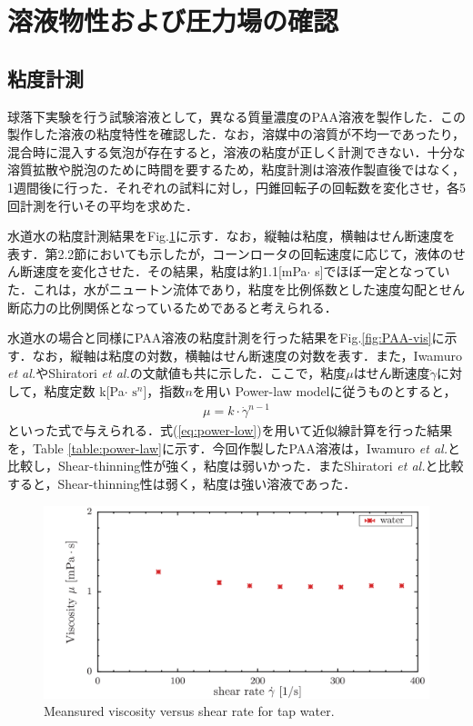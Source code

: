 \section{溶液物性および圧力場の確認}
\subsection{粘度計測}
球落下実験を行う試験溶液として，異なる質量濃度のPAA溶液を製作した．この製作した溶液の粘度特性を確認した．なお，溶媒中の溶質が不均一であったり，混合時に混入する気泡が存在すると，溶液の粘度が正しく計測できない．十分な溶質拡散や脱泡のために時間を要するため，粘度計測は溶液作製直後ではなく，1週間後に行った．それぞれの試料に対し，円錐回転子の回転数を変化させ，各5回計測を行いその平均を求めた．

水道水の粘度計測結果をFig.\ref{fig:water-vis}に示す．なお，縦軸は粘度，横軸はせん断速度を表す．第2.2節においても示したが，コーンロータの回転速度に応じて，液体のせん断速度を変化させた．その結果，粘度は約1.1[mPa$\cdot$ s]でほぼ一定となっていた．これは，水がニュートン流体であり，粘度を比例係数とした速度勾配とせん断応力の比例関係となっているためであると考えられる．

水道水の場合と同様にPAA溶液の粘度計測を行った結果をFig.\ref{fig:PAA-vis}に示す．なお，縦軸は粘度の対数，横軸はせん断速度の対数を表す．また，Iwamuro {\it et al.}\cite{ref:9}やShiratori {\it et al.}\cite{ref:10}の文献値も共に示した．ここで，粘度$\mu$はせん断速度$\dot{\gamma}$に対して，粘度定数 k[Pa$\cdot$ $\text{s}^n$]，指数$n$を用い Power-law modelに従うものとすると，
\begin{eqnarray}
    \label{eq:power-low}
    \mu=k\cdot\dot{\gamma}^{n-1}
\end{eqnarray}
といった式で与えられる\cite{ref:1}．式(\ref{eq:power-low})を用いて近似線計算を行った結果を，Table \ref{table:power-law}に示す．今回作製したPAA溶液は，Iwamuro {\it et al.}と比較し，Shear-thinning性が強く，粘度は弱いかった．またShiratori {\it et al.}と比較すると，Shear-thinning性は弱く，粘度は強い溶液であった．

\begin{figure}[ht]
    \centering
    \includegraphics[width=12cm,clip]{4-Results/water.png}
    \caption{Meansured viscosity versus shear rate for tap water.}
    \label{fig:water-vis}
\end{figure}

